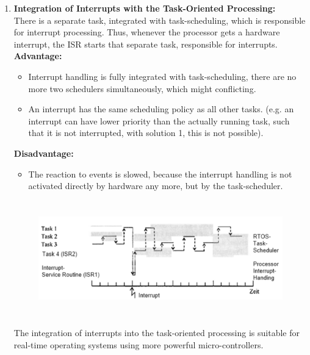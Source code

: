 \begin{enumerate}
\item {\rot\bf Integration of Interrupts with the Task-Oriented Processing: }\\

There is a separate task, integrated with task-scheduling, which is responsible for interrupt processing. Thus, whenever the processor gets a hardware interrupt, the ISR starts that separate task, responsible for interrupts.\\

\textbf{Advantage: }

\begin{itemize}
	\item Interrupt handling is fully integrated with task-scheduling,   there are no more two schedulers simultaneously, which might conflicting.
	\item An interrupt has the same scheduling policy as all other tasks.   (e.g. an interrupt can have lower priority than the actually running task, such that it   is not interrupted, with solution 1, this is not possible).
\end{itemize}  

\textbf{Disadvantage: } 

\begin{itemize}
	\item The reaction to events is slowed, because the interrupt handling is not activated   directly by hardware any more, but by the task-scheduler.
\end{itemize} 

 	\begin{figure}[h]
    \centering
    \includegraphics[width=14cm, height=5cm]{Images/image23.png}
    \label{fig:Fig 77}
    \end{figure}

The integration of interrupts into the task-oriented processing is suitable for real-time operating systems using more powerful micro-controllers.
\end{enumerate}
\newpage

